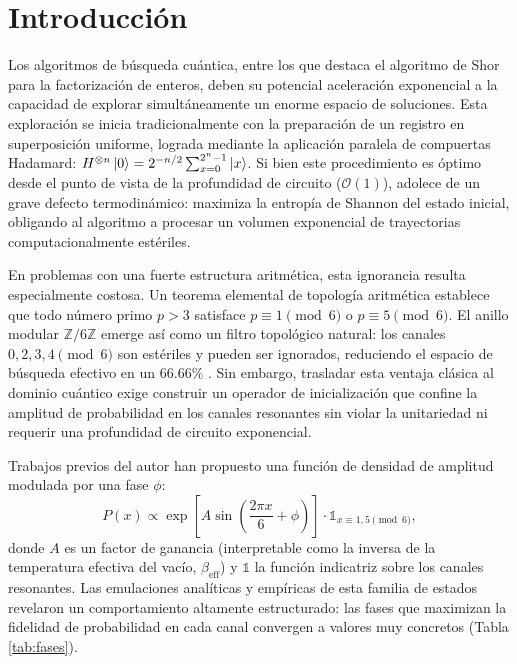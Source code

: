 \documentclass[12pt,a4paper]{article}
\theoremstyle{plain}
\theoremstyle{definition}
\theoremstyle{remark}
\begin{document}
\tableofcontents
\newpage

\section{Introducción}

Los algoritmos de búsqueda cuántica, entre los que destaca el algoritmo de Shor para la factorización de enteros\cite{Shor1994}, deben su potencial aceleración exponencial a la capacidad de explorar simultáneamente un enorme espacio de soluciones. Esta exploración se inicia tradicionalmente con la preparación de un registro en superposición uniforme, lograda mediante la aplicación paralela de compuertas Hadamard: $H^{\otimes n}\ket{0} = 2^{-n/2}\sum_{x=0}^{2^n-1}\ket{x}$. Si bien este procedimiento es óptimo desde el punto de vista de la profundidad de circuito ($\mathcal{O}(1)$), adolece de un grave defecto termodinámico: maximiza la entropía de Shannon del estado inicial, obligando al algoritmo a procesar un volumen exponencial de trayectorias computacionalmente estériles.

En problemas con una fuerte estructura aritmética, esta ignorancia resulta especialmente costosa. Un teorema elemental de topología aritmética establece que todo número primo $p>3$ satisface $p \equiv 1 \pmod 6$ o $p \equiv 5 \pmod 6$. El anillo modular $\mathbb{Z}/6\mathbb{Z}$ emerge así como un filtro topológico natural: los canales $0,2,3,4 \pmod 6$ son estériles y pueden ser ignorados, reduciendo el espacio de búsqueda efectivo en un $66.66\%$ \cite{PeinadorSpectrum}. Sin embargo, trasladar esta ventaja clásica al dominio cuántico exige construir un operador de inicialización que confine la amplitud de probabilidad en los canales resonantes sin violar la unitariedad ni requerir una profundidad de circuito exponencial.

Trabajos previos del autor \cite{PeinadorDSP} han propuesto una función de densidad de amplitud modulada por una fase $\phi$:
\begin{equation}
P(x) \propto \exp\left[A \sin\left(\frac{2\pi x}{6} + \phi\right)\right] \cdot \mathds{1}_{x\equiv 1,5 \pmod{6}},
\label{eq:amplitud}
\end{equation}
donde $A$ es un factor de ganancia (interpretable como la inversa de la temperatura efectiva del vacío, $\beta_{\text{eff}}$) y $\mathds{1}$ la función indicatriz sobre los canales resonantes. Las emulaciones analíticas y empíricas de esta familia de estados revelaron un comportamiento altamente estructurado: las fases que maximizan la fidelidad de probabilidad en cada canal convergen a valores muy concretos (Tabla \ref{tab:fases}).
\end{document}

